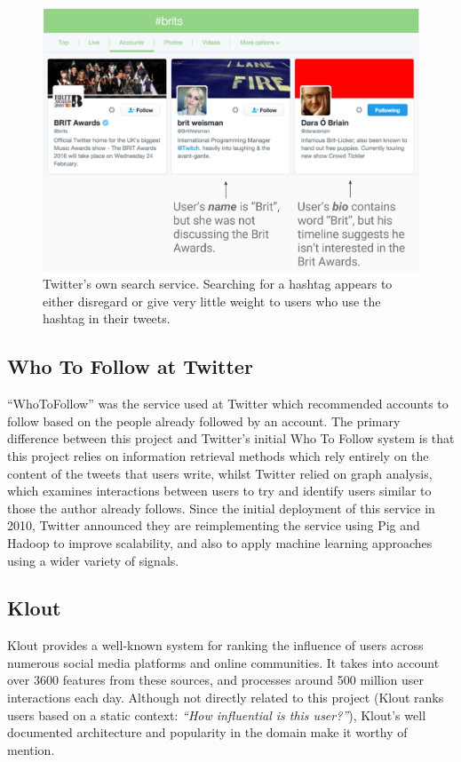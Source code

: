 \documentclass{l4proj}
\begin{document}
\begin{figure}
\centering
\includegraphics[scale=0.4]{twittersearch.png}
\caption{Twitter's own search service. Searching for a hashtag appears to either disregard or give very little weight to users who use the hashtag in their tweets.}
\label{twittersearch}
\end{figure}



\subsection{Who To Follow at Twitter}
``WhoToFollow'' was the service used at Twitter which recommended accounts to follow based on the people already followed by an account. The primary difference between this project and Twitter's initial Who To Follow system is that this project relies on information retrieval methods which rely entirely on the content of the tweets that users write, whilst Twitter relied on graph analysis, which examines interactions between users to try and identify users similar to those the author already follows. Since the initial deployment of this service in 2010, Twitter announced they are reimplementing the service using Pig and Hadoop to improve scalability, and also to apply machine learning approaches using a wider variety of signals.

\subsection{Klout}
Klout provides a well-known system for ranking the influence of users across numerous social media platforms and online communities. It takes into account over 3600 features from these sources, and processes around 500 million user interactions each day. Although not directly related to this project (Klout ranks users based on a static context: \textit{``How influential is this user?''}), Klout's well documented architecture and popularity in the domain make it worthy of mention.
\end{document}
